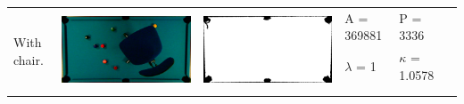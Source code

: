 \begin{table}[H]
\begin{tabular}{|l|c|c|l|l|c|}
\multirow{4}{*}{With chair.} & \multirow{4}{*}{\includegraphics[scale=0.08]{../images/1/5_img.png}} & \multirow{4}{*}{\includegraphics[scale=0.08]{../images/1/5_mask.png}} & A = 369881 & P = 3336 & \multirow{4}{*}{}\\  
& & & $\lambda$ = 1 & $\kappa$ = 1.0578 & \\
&&&&&\\
&&&&&\\
\hline


\end{tabular}
\end{table}
